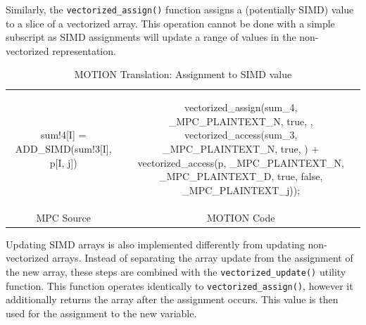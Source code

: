 Similarly, the \texttt{vectorized\_assign()} function assigns a (potentially SIMD) value to a slice of a vectorized array.  This operation cannot be done with a simple subscript as SIMD assignments will update a range of values in the non-vectorized representation.

\begin{table}
\begin{tabular}{cc}
\begin{minipage}{0.33\textwidth}
{\small
\begin{pythonn}
sum!4[I] = ADD_SIMD(sum!3[I], p[I, j])
\end{pythonn}
}
\end{minipage}

&

\begin{minipage}{0.66\textwidth}
{\small
\begin{cppp}
vectorized_assign(sum_4, {_MPC_PLAINTEXT_N}, {true}, {},
      vectorized_access(sum_3, {_MPC_PLAINTEXT_N}, {true}, {}) +
      vectorized_access(p, {_MPC_PLAINTEXT_N, _MPC_PLAINTEXT_D}, {true, false},
           {_MPC_PLAINTEXT_j}));
\end{cppp}
}
\end{minipage}

\\

MPC Source & MOTION Code
\end{tabular}
\caption{MOTION Translation: Assignment to SIMD value}
\label{tab:motion_translation_simd_assignment}
\end{table}

Updating SIMD arrays is also implemented differently from updating non-vectorized arrays.  Instead of separating the array update from the assignment of the new array, these steps are combined with the \texttt{vectorized\_update()} utility function.  This function operates identically to \texttt{vectorized\_assign()}, however it additionally returns the array after the assignment occurs.  This value is then used for the assignment to the new variable.


